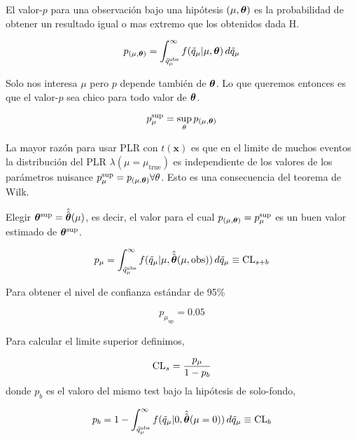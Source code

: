 El valor-$p$ para una observación bajo una hipótesis $(\mu,\bm{\theta})$ es la probabilidad de obtener
un resultado igual o mas extremo que los obtenidos dada H.

\begin{equation}
  p_{(\mu,\bm{\theta})} = \int_{\tilde{q}_\mu^\text{obs}}^{\infty} f(\tilde{q}_\mu|\mu,\bm{\theta}) \, d\tilde{q}_\mu
\end{equation}


Solo nos interesa $\mu$ pero $p$ depende también de $\bm{\theta}$. Lo que queremos entonces es
que el valor-$p$ sea chico para todo valor de $\bm{\theta}$.

\begin{equation}
  p_\mu^\text{sup} = \sup_\theta p_{(\mu,\bm{\theta})}
\end{equation}

La mayor razón para usar PLR con $t(\bm{x})$ es que en el limite de muchos eventos
la distribución del PLR $\lambda(\mu=\mu_\text{true})$ es independiente de los
valores de los parámetros nuisance $p_\mu^\text{sup} = p_{(\mu,\bm{\theta})} \forall \theta$.
Esto es una consecuencia del teorema de Wilk.


Elegir $\bm{\theta}^\text{sup} = \hat{\hat{\bm{\theta}}}(\mu)$, es decir, el valor para el cual $p_{(\mu,\bm{\theta})} = p_\mu^\text{sup}$
es un buen valor estimado de $\bm{\theta}^\text{sup}$.

\begin{equation}
  p_\mu = \int_{\tilde{q}_\mu^\text{obs}}^{\infty} f(\tilde{q}_\mu|\mu,\hat{\hat{\bm{\theta}}}(\mu, \text{obs})) \, d\tilde{q}_\mu \equiv \text{CL}_{s+b}
  \label{eq:pmu}
\end{equation}


Para obtener el nivel de confianza estándar de 95\%

\begin{equation}
  p_{\mu_\text{up}} = 0.05
\end{equation}

Para calcular el limite superior {\cls} definimos,

\begin{equation}
  \text{CL}_s = \frac{p_\mu}{1-p_b}
\end{equation}
%
donde $p_b$ es el valoro del mismo test bajo la hipótesis de solo-fondo,

\begin{equation}
  p_b = 1 - \int_{\tilde{q}_\mu^\text{obs}}^{\infty} f(\tilde{q}_\mu|0,\hat{\hat{\bm{\theta}}}(\mu=0)) \, d\tilde{q}_\mu \equiv \text{CL}_b
\end{equation}


